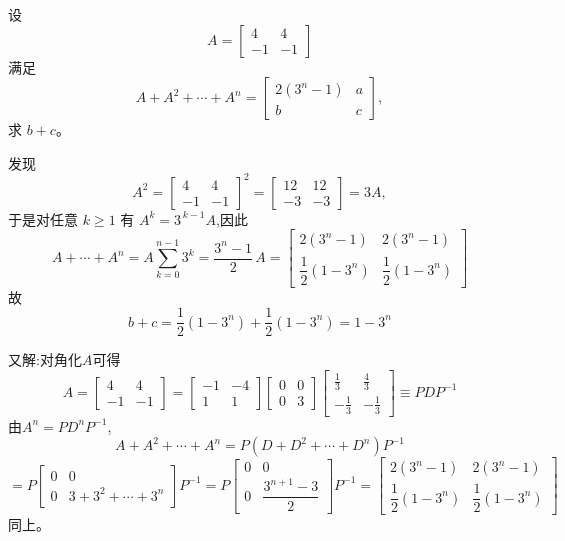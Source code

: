 \begin{questions}
    \question 设 $$A=\begin{bmatrix} 4 & 4 \\ -1 & -1 \end{bmatrix}$$满足 $$A+A^2+\cdots+A^n = \begin{bmatrix} 2(3^n-1) & a \\ b & c \end{bmatrix},$$求 $b+c$。
    \begin{solution}
        发现
        \[
        A^2=\begin{bmatrix}4&4\\-1&-1\end{bmatrix}^2
        =\begin{bmatrix}12&12\\-3&-3\end{bmatrix}=3A,
        \]
        于是对任意 $k\ge1$ 有 $A^k=3^{\,k-1}A$,因此
        \[
        A+\cdots+A^n
        =A\sum_{k=0}^{n-1}3^k
        =\frac{3^n-1}{2}\,A
        =\begin{bmatrix} 2(3^n-1) & 2(3^n-1) \\ \dfrac12(1-3^n) & \dfrac12(1-3^n) \end{bmatrix}
        \]
        故
        \[
        b+c = \frac12(1-3^n) + \frac12(1-3^n) = 1 - 3^n
        \]
    \end{solution}
    \begin{solution}
        又解:对角化$A$可得
        \[
        A=\begin{bmatrix}4 & 4 \\ -1 & -1 \end{bmatrix} 
        =\begin{bmatrix}-1 & -4 \\ 1 & 1 \end{bmatrix} 
        \begin{bmatrix}0 & 0 \\ 0 & 3 \end{bmatrix} 
        \begin{bmatrix} \frac13 & \frac43 \\ -\frac13 & -\frac13 \end{bmatrix} \equiv P D P^{-1}
        \]
        由$A^n = P D^n P^{-1}$,
        \[
        A + A^2 + \cdots + A^n = P(D + D^2 + \cdots + D^n)P^{-1}
        \]
        \[
        = P \begin{bmatrix}0 & 0 \\ 0 & 3+3^2+\cdots+3^n \end{bmatrix} P^{-1} 
        = P \begin{bmatrix}0 & 0 \\ 0 & \dfrac{3^{n+1}-3}{2} \end{bmatrix} P^{-1}
        = \begin{bmatrix} 2(3^n-1) & 2(3^n-1) \\ \dfrac12(1-3^n) & \dfrac12(1-3^n) \end{bmatrix}
        \]
        同上。
    \end{solution}


\end{questions}
